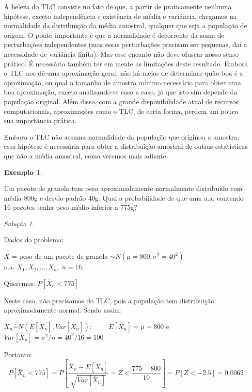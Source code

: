 \documentclass[
]{book}
\theoremstyle{definition}
\theoremstyle{definition}
\newtheorem{example}{Exemplo}[chapter]
\theoremstyle{definition}
\theoremstyle{remark}
\newtheorem*{solution}{Solução}
\begin{document}
A beleza do TLC consiste no fato de que, a partir de praticamente nenhuma hipótese, exceto independência e existência de média e variância, chegamos na normalidade da distribuição da média amostral, qualquer que seja a população de origem. O ponto importante é que a normalidade é decorrente da soma de perturbações independentes (mas essas perturbações precisam ser pequenas, daí a necessidade de variância finita). Mas esse encanto não deve ofuscar nosso senso prático. É necessário também ter em mente as limitações deste resultado. Embora o TLC nos dê uma aproximação geral, não há meios de determinar quão boa é a aproximação, ou qual o tamanho de amostra mínimo necessário para obter uma boa aproximação, exceto analisando-se caso a caso, já que isto sim depende da população original. Além disso, com a grande disponibilidade atual de recursos computacionais, aproximações como o TLC, de certa forma, perdem um pouco sua importância prática.

Embora o TLC não assuma normalidade da população que originou a amostra, essa hipótese é necessária para obter a distribuição amostral de outras estatísticas que não a média amostral, como veremos mais adiante.

\begin{example}
\protect\hypertarget{exm:unnamed-chunk-20}{}{\label{exm:unnamed-chunk-20} }
\end{example}

Um pacote de granola tem peso aproximadamente normalmente distribuído com média 800g e desvio-padrão 40g. Qual a probabilidade de que uma a.a. contendo 16 pacotes tenha peso médio inferior a 775g?

\begin{solution}
{}
\end{solution}

Dados do problema:

\(X\) = peso de um pacote de granola \(\stackrel{\cdot}{\sim} N(\mu = 800, \sigma^2 = 40^2)\qquad\)\\
a.a. \(X_1, X_2, \ldots, X_n, \; n=16\).

Queremos: \(P[\bar{X}_n < 775]\)

Neste caso, não precisamos do TLC, pois a população tem distribuição aproximadamente normal. Sendo assim:

\(\bar{X}_n \stackrel{\cdot}{\sim} N(E[\bar{X}_n], Var[\bar{X}_n]): \qquad\)
\(E[\bar{X}_n] = \mu = 800\) e
\(Var[\bar{X}_n] = \sigma^2/n = 40^2/16= 100\)

Portanto:
\[P[\bar{X}_n < 775] = P\left[\frac{\bar{X}_n - E[\bar{X}_n]}{\sqrt{Var[\bar{X}_n]}} = Z < \frac{775 -800}{10}\right] = P[Z < -2.5] = 0.0062\]
\end{document}
